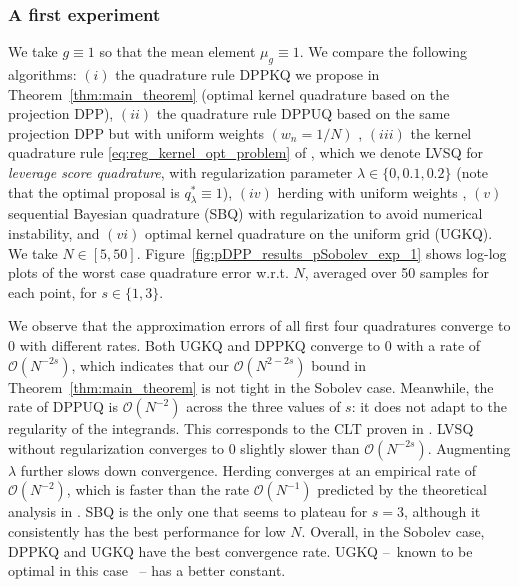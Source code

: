 \documentclass[twoside,11pt]{book}
\numberwithin{theorem}{chapter}
\numberwithin{definition}{chapter}
\numberwithin{proposition}{chapter}
\numberwithin{corollary}{chapter}
\numberwithin{example}{chapter}
\numberwithin{lemma}{chapter}
\begin{document}
\subsubsection{A first experiment}
 We take $g\equiv 1$ so that the mean element $\mu_{g} \equiv 1$. We compare the following algorithms: $(i)$ the quadrature rule DPPKQ we propose in Theorem~\ref{thm:main_theorem} (optimal kernel quadrature based on the projection DPP), $(ii)$ the quadrature rule DPPUQ based on the same projection DPP but with uniform weights $(w_{n} = 1/N)$ \cite{Joh97}, $(iii)$ the kernel quadrature rule \eqref{eq:reg_kernel_opt_problem} of \cite{Bac17}, which we denote LVSQ for \emph{leverage score quadrature}, with regularization parameter $\lambda \in \{0,0.1,0.2\}$ (note that the optimal proposal is $q_{\lambda}^* \equiv 1$), $(iv)$ herding with uniform weights \citep{BaLaOb12,ChWeSm10}, $(v)$ sequential Bayesian quadrature (SBQ) \citep{HuDu12} with regularization to avoid numerical instability, and $(vi)$ optimal kernel quadrature on the uniform grid (UGKQ). We take $N \in [5,50]$. Figure~\ref{fig:pDPP_results_pSobolev_exp_1} shows log-log plots of the worst case quadrature error w.r.t. $N$, averaged over 50 samples for each point, for $s \in \{1,3\}$.


 We observe that the approximation errors of all first four quadratures converge to $0$ with different rates. Both UGKQ and DPPKQ converge to $0$ with a rate of $\mathcal{O}(N^{-2s})$, which indicates that our $\mathcal{O}(N^{2-2s})$ bound in Theorem~\ref{thm:main_theorem} is not tight in the Sobolev case. Meanwhile, the rate of DPPUQ is $\mathcal{O}(N^{-2})$ across the three values of $s$: it does not adapt to the regularity of the integrands. This corresponds to the CLT proven in \cite{Joh97}.
  LVSQ without regularization converges to $0$ slightly slower than $\mathcal{O}(N^{-2s})$. Augmenting $\lambda$ further slows down convergence. Herding converges at an empirical rate of $\mathcal{O}(N^{-2})$, which is faster than the rate $\mathcal{O}(N^{-1})$ predicted by the theoretical analysis in \cite{BaLaOb12,ChWeSm10}. SBQ is the only one that seems to plateau for $s = 3$, although it consistently has the best performance for low $N$.
Overall, in the Sobolev case, DPPKQ and UGKQ have the best convergence rate. UGKQ --~known to be optimal in this case \cite{Boj81}~-- has a better constant.
\end{document}
